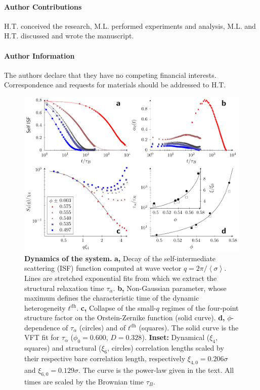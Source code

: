 \paragraph*{\bf Author Contributions}
H.T. conceived the research, M.L. performed experiments and analysis, M.L. and H.T. discussed and wrote the manuscript.

\paragraph*{\bf Author Information} 
The authors declare that they have no competing financial interests. 
Correspondence and requests for materials should be addressed to 
H.T. 

\clearpage

\begin{figure}
\begin{center}
\includegraphics{fig_vft.pdf}
\end{center}
\caption{\textbf{Dynamics of the system.} 
	\textbf{a,} Decay of the self-intermediate scattering (ISF) function computed at wave vector $q=2\pi/\left\langle \sigma\right\rangle$. Lines are stretched exponential fits from which we extract the structural relaxation time $\tau_\alpha$. 
	\textbf{b,} Non-Gaussian parameter, whose maximum defines the characteristic time of the dynamic heterogeneity $t^\text{dh}$.
	\textbf{c,} Collapse of the small-$q$ regimes of the four-point structure factor on the Orstein-Zernike function (solid curve).
	\textbf{d,} $\phi$-dependence of $\tau_\alpha$ (circles) and of $t^\text{dh}$ (squares). The solid curve is the VFT fit for $\tau_\alpha$ ($\phi_0=0.600$, $D=0.328$). 
	\textbf{Inset:} Dynamical ($\xi_4$, squares) and structural ($\xi_6$, circles) correlation lengths  scaled by their respective bare correlation length, respectively $\xi_{4,0}=0.206\sigma$ and $\xi_{6,0}=0.129\sigma$. The curve is the power-law given in the text.
	All times are scaled by the Brownian time $\tau_B$.}
	\label{fig:vft}
\end{figure}

